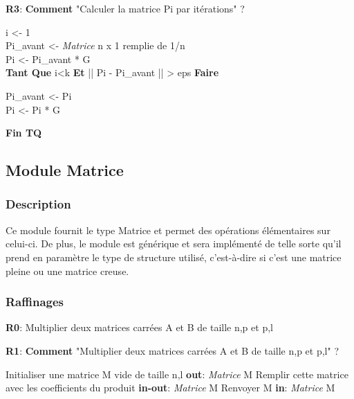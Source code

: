 \documentclass{NewTeXRaffinage}
\begin{document}
\textbf{R3}: \textbf{Comment} "Calculer la matrice Pi par itérations" ?
\begin{addmargin}[5em]{0pt}
    i <- 1 \\
    Pi\_avant <- \textit{Matrice} n x 1 remplie de 1/n \\
    Pi <- Pi\_avant * G \\
    \textbf{Tant Que} i<k \textbf{Et} || Pi - Pi\_avant || > eps \textbf{Faire}
        \begin{addmargin}[5em]{0pt}
            Pi\_avant <- Pi \\
            Pi <- Pi * G
        \end{addmargin}
    \textbf{Fin TQ}
\end{addmargin}




\subsection{Module Matrice}

\subsubsection{Description}

Ce module fournit le type Matrice et permet des opérations élémentaires sur celui-ci. De plus, le module est générique et sera implémenté de telle sorte qu'il prend en paramètre le type de structure utilisé, c'est-à-dire si c'est une matrice pleine ou une matrice creuse.

\subsubsection{Raffinages}

\textbf{R0}: Multiplier deux matrices carrées A et B de taille n,p et p,l

\textbf{R1}: \textbf{Comment} "Multiplier deux matrices carrées A et B de taille n,p et p,l" ?
\begin{addmargin}[5em]{0pt}
    Initialiser une matrice M vide de taille n,l  \hspace*{0pt}\hfill \textbf{out}: \textit{Matrice} M 
    \newline Remplir cette matrice avec les coefficients du produit \hspace*{0pt}\hfill \textbf{in-out}: \textit{Matrice} M 
    \newline Renvoyer M \hspace*{0pt}\hfill \textbf{in}: \textit{Matrice} M 
\end{addmargin}
\end{document}
